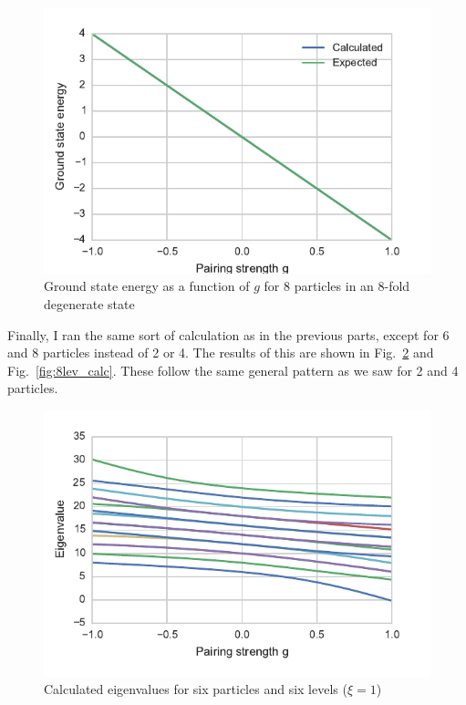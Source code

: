 \documentclass{article}
\begin{document}
	\begin{figure}[p]
		\centering
		\includegraphics{gs8.pdf}
		\caption{Ground state energy as a function of $g$ for 8 particles in an 8-fold degenerate state}
		\label{fig:gs8}
	\end{figure}

	Finally, I ran the same sort of calculation as in the previous parts, except for 6 and 8 particles instead of 2 or 4. The results of this are shown in Fig.~\ref{fig:6lev_calc} and Fig.~\ref{fig:8lev_calc}. These follow the same general pattern as we saw for 2 and 4 particles.

	\begin{figure}[p]
		\centering
		\includegraphics{calc6.pdf}
		\caption{Calculated eigenvalues for six particles and six levels ($\xi=1$)}
		\label{fig:6lev_calc}
	\end{figure}
\end{document}
